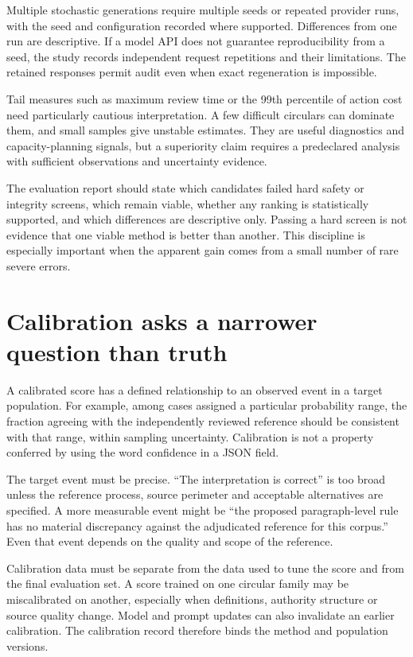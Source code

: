 \documentclass[12pt,a4paper,oneside,openany]{book}
\begin{document}
Multiple stochastic generations require multiple seeds or repeated provider runs,
with the seed and configuration recorded where supported. Differences from one
run are descriptive. If a model API does not guarantee reproducibility from a
seed, the study records independent request repetitions and their limitations.
The retained responses permit audit even when exact regeneration is impossible.

Tail measures such as maximum review time or the 99th percentile of action cost
need particularly cautious interpretation. A few difficult circulars can dominate
them, and small samples give unstable estimates. They are useful diagnostics and
capacity-planning signals, but a superiority claim requires a predeclared analysis
with sufficient observations and uncertainty evidence.

The evaluation report should state which candidates failed hard safety or
integrity screens, which remain viable, whether any ranking is statistically
supported, and which differences are descriptive only. Passing a hard screen is
not evidence that one viable method is better than another. This discipline is
especially important when the apparent gain comes from a small number of rare
severe errors.

\section{Calibration asks a narrower question than truth}
\label{merge:M09:08}


A calibrated score has a defined relationship to an observed event in a target
population. For example, among cases assigned a particular probability range,
the fraction agreeing with the independently reviewed reference should be
consistent with that range, within sampling uncertainty. Calibration is not a
property conferred by using the word confidence in a JSON field.

The target event must be precise. ``The interpretation is correct'' is too broad
unless the reference process, source perimeter and acceptable alternatives are
specified. A more measurable event might be ``the proposed paragraph-level rule
has no material discrepancy against the adjudicated reference for this corpus.''
Even that event depends on the quality and scope of the reference.

Calibration data must be separate from the data used to tune the score and from
the final evaluation set. A score trained on one circular family may be
miscalibrated on another, especially when definitions, authority structure or
source quality change. Model and prompt updates can also invalidate an earlier
calibration. The calibration record therefore binds the method and population
versions.
\end{document}
